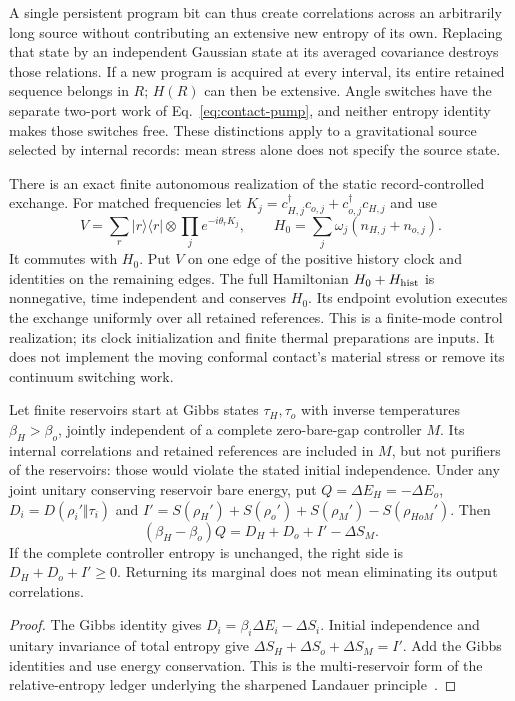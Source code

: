 A single persistent program bit can thus create correlations across
an arbitrarily long source without contributing an extensive new
entropy of its own. Replacing that state by an independent Gaussian
state at its averaged covariance destroys those relations. If a new
program is acquired at every interval, its entire retained sequence
belongs in $R$; $H(R)$ can then be extensive. Angle switches have
the separate two-port work of Eq.~\eqref{eq:contact-pump}, and neither
entropy identity makes those switches free. These distinctions apply
to a gravitational source selected by internal records: mean stress
alone does not specify the source state.

There is an exact finite autonomous realization of the static
record-controlled exchange. For matched frequencies let
$K_j=c_{H,j}^\dagger c_{o,j}+c_{o,j}^\dagger c_{H,j}$ and use
\[
 V=\sum_r|r\rangle\langle r|\otimes
        \prod_j e^{-i\theta_r K_j},\qquad
 H_0=\sum_j\omega_j(n_{H,j}+n_{o,j}).
\]
It commutes with $H_0$. Put $V$ on one edge of the positive history
clock and identities on the remaining edges. The full Hamiltonian
$H_0+H_{\rm hist}$ is nonnegative, time independent and conserves
$H_0$. Its endpoint evolution executes the exchange uniformly over
all retained references. This is a finite-mode control realization;
its clock initialization and finite thermal preparations are inputs.
It does not implement the moving conformal contact's material stress
or remove its continuum switching work.

\begin{proposition}
\label{prop:programmed-ledger}
Let finite reservoirs start at Gibbs states $\tau_H,\tau_o$ with
inverse temperatures $\beta_H>\beta_o$, jointly independent of a
complete zero-bare-gap controller $M$. Its internal correlations and
retained references are included in $M$, but not purifiers of the
reservoirs: those would violate the stated initial independence.
Under any joint unitary
conserving reservoir bare energy, put $Q=\Delta E_H=-\Delta E_o$,
$D_i=D(\rho_i'\Vert\tau_i)$ and
$I'=S(\rho_H')+S(\rho_o')+S(\rho_M')-S(\rho_{HoM}')$.
Then
\begin{equation}\label{eq:programmed-ledger}
 (\beta_H-\beta_o)Q=D_H+D_o+I'-\Delta S_M.
\end{equation}
If the complete controller entropy is unchanged, the right side is
$D_H+D_o+I'\ge0$. Returning its marginal does not mean eliminating
its output correlations.
\end{proposition}
\begin{proof}
The Gibbs identity gives $D_i=\beta_i\Delta E_i-\Delta S_i$.
Initial independence and unitary invariance of total entropy give
$\Delta S_H+\Delta S_o+\Delta S_M=I'$.
Add the Gibbs identities and use energy conservation.
This is the multi-reservoir form of the relative-entropy ledger
underlying the sharpened Landauer principle~\cite[Theorem~3]{ReebWolf2014}.
\end{proof}

